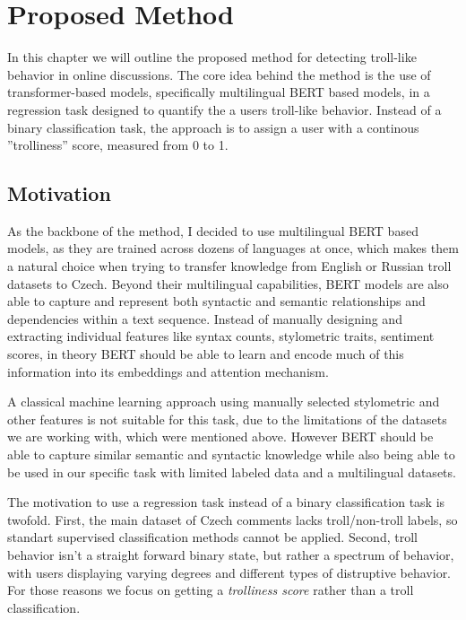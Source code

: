 \documentclass[twoside]{ctuthesis}
\theoremstyle{plain}
\theoremstyle{definition}
\theoremstyle{note}
\begin{document}
\chapter{Proposed Method}
In this chapter we will outline the proposed method for detecting troll-like behavior in online discussions. The core idea behind the method is the use of transformer-based models, specifically multilingual BERT based models, in a regression task designed to quantify the a users troll-like behavior. Instead of a binary classification task, the approach is to assign a user with a continous ''trolliness'' score, measured from 0 to 1.\par

\section{Motivation}
As the backbone of the method, I decided to use multilingual BERT based models, as they are trained across dozens of languages at once, which makes them a natural choice when trying to transfer knowledge from English or Russian troll datasets to Czech. Beyond their multilingual capabilities, BERT models are also able to capture and represent both syntactic and semantic relationships and dependencies within a text sequence. Instead of manually designing and extracting individual features like syntax counts, stylometric traits, sentiment scores, in theory BERT should be able to learn and encode much of this information into its embeddings and attention mechanism.\cite{Rogers2020}\par
A classical machine learning approach using manually selected stylometric and other features is not suitable for this task, due to the limitations of the datasets we are working with, which were mentioned above. However BERT should be able to capture similar semantic and syntactic knowledge while also being able to be used in our specific task with limited labeled data and a multilingual datasets.\par
The motivation to use a regression task instead of a binary classification task is twofold. First, the main dataset of Czech comments lacks troll/non-troll labels, so standart supervised classification methods cannot be applied. Second, troll behavior isn't a straight forward binary state, but rather a spectrum of behavior, with users displaying varying degrees and different types of distruptive behavior. For those reasons we focus on getting a \textit{trolliness score} rather than a troll classification.\par
\end{document}
